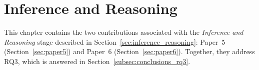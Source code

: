 \chapter{Inference and Reasoning}
\label{chap:inference_reasoning}

This chapter contains the two contributions associated with the \emph{Inference and Reasoning} stage described in Section~\ref{sec:inference_reasoning}: Paper~5 (Section~\ref{sec:paper5}) and Paper~6 (Section~\ref{sec:paper6}). Together, they address RQ3, which is answered in Section~\ref{subsec:conclusions_rq3}.




